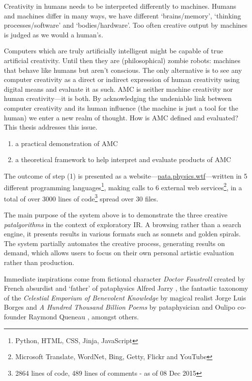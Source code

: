 Creativity in humans needs to be interpreted differently to machines. Humans and machines differ in many ways, we have different `brains/memory', `thinking processes/software' and `bodies/hardware'. Too often creative output by machines is judged as we would a human's. 

Computers which are truly artificially intelligent might be capable of true artificial creativity. Until then they are (philosophical) zombie robots: machines that behave like humans but aren't conscious. The only alternative is to see any computer creativity as a direct or indirect expression of human creativity using digital means and evaluate it as such. \ac{AMC} is neither machine creativity nor human creativity---it is both. By acknowledging the undeniable link between computer creativity and its human influence (the machine is just a tool for the human) we enter a new realm of thought. How is \ac{AMC} defined and evaluated? This thesis addresses this issue. 

\begin{enumerate}
  \item a practical demonstration of \ac{AMC}
  \item a theoretical framework to help interpret and evaluate products of \ac{AMC}
\end{enumerate}

The outcome of step (1) is presented as a website---\url{pata.physics.wtf}---written in \num{5} different programming languages\footnote{Python, \acs{HTML}, \acs{CSS}, Jinja, JavaScript}, making calls to \num{6} external web services\footnote{Microsoft Translate, WordNet, Bing, Getty, Flickr and YouTube}, in a total of over \num{3000} lines of code\footnote{\num{2864} lines of code, \num{489} lines of comments - as of 08 Dec 2015} spread over \num{30} files.

The main purpose of the system above is to demonstrate the three creative \emph{patalgorithms} in the context of exploratory \acf{IR}. A browsing rather than a search engine, it presents results in various formats such as sonnets and golden spirals. The system partially automates the creative process, generating results on demand, which allows users to focus on their own personal artistic evaluation rather than production.

Immediate inspirations come from fictional character \textit{Doctor Faustroll} created by French absurdist and `father' of pataphysics Alfred Jarry \autocite*{Jarry1996}, the fantastic taxonomy of the \textit{Celestial Emporium of Benevolent Knowledge} by magical realist Jorge Luis Borges \autocite*{Borges2000} and \textit{A Hundred Thousand Billion Poems} by pataphysician and Oulipo co-founder Raymond Queneau \autocite*{Queneau1961}, amongst others.

